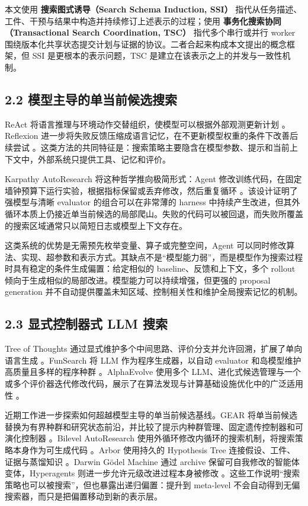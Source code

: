 \documentclass[
  11pt]{ctexart}
\begin{document}
本文使用 \textbf{搜索图式诱导（Search Schema Induction, SSI）}
指代从任务描述、工件、干预与结果中构造并持续修订上述表示的过程；使用
\textbf{事务化搜索协同（Transactional Search Coordination, TSC）}
指代多个串行或并行 worker
围绕版本化共享状态提交计划与证据的协议。二者合起来构成本文提出的概念框架，但
SSI 是更根本的表示问题，TSC 是建立在该表示之上的并发与一致性机制。

\subsection{2.2
模型主导的单当前候选搜索}\label{ux6a21ux578bux4e3bux5bfcux7684ux5355ux5f53ux524dux5019ux9009ux641cux7d22}

ReAct 将语言推理与环境动作交替组织，使模型可以根据外部观测更新计划
\cite{yao2023react}。Reflexion
进一步将失败反馈压缩成语言记忆，在不更新模型权重的条件下改善后续尝试
\cite{shinn2023reflexion}。这类方法的共同特征是：搜索策略主要隐含在模型参数、提示和当前上下文中，外部系统只提供工具、记忆和评价。

Karpathy AutoResearch 将这种哲学推向极简形式：Agent
修改训练代码，在固定墙钟预算下运行实验，根据指标保留或丢弃修改，然后重复循环
\cite{karpathy2026autoresearch}。该设计证明了强模型与清晰
evaluator 的组合可以在非常薄的 harness
中持续产生改进，但其外循环本质上仍接近单当前候选的局部爬山。失败的代码可以被回退，而失败所覆盖的搜索区域通常只以简短日志或模型上下文存在。

这类系统的优势是无需预先枚举变量、算子或完整空间，Agent
可以同时修改算法、实现、超参数和表示方式。其缺点不是``模型能力弱''，而是模型作为搜索过程时具有稳定的条件生成偏置：给定相似的
baseline、反馈和上下文，多个 rollout
倾向于生成相似的局部改进。模型能力可以持续增强，但更强的 proposal
generation
并不自动提供覆盖未知区域、控制相关性和维护全局搜索记忆的机制。

\subsection{2.3 显式控制器式 LLM
搜索}\label{ux663eux5f0fux63a7ux5236ux5668ux5f0f-llm-ux641cux7d22}

Tree of Thoughts
通过显式维护多个中间思路、评价分支并允许回溯，扩展了单向语言生成
\cite{yao2023tot}。FunSearch 将 LLM
作为程序生成器，以自动 evaluator 和岛模型维护高质量且多样的程序种群
\cite{romeraparedes2024funsearch}。AlphaEvolve 使用多个
LLM、进化式候选管理与一个或多个评价器迭代修改代码，展示了在算法发现与计算基础设施优化中的广泛适用性
\cite{novikov2025alphaevolve}。

近期工作进一步探索如何超越模型主导的单当前候选基线。GEAR
将单当前候选替换为有界种群和研究状态前沿，并比较了提示内种群管理、固定遗传控制器和可演化控制器
\cite{jeddi2026gear}。Bilevel AutoResearch
使用外循环修改内循环的搜索机制，将搜索策略本身作为可生成代码
\cite{qu2026bilevel}。Arbor 使用持久的 Hypothesis Tree
连接假设、工件、证据与蒸馏知识
\cite{jin2026arbor}。Darwin Gödel Machine 通过 archive
保留可自我修改的智能体变体，Hyperagents
则进一步允许元级改进过程本身被修改
\cite{zhang2025dgm,zhang2026hyperagents}。这些工作说明``搜索策略也可以被搜索''，但也暴露出递归偏置：提升到
meta-level 不会自动得到无偏搜索器，而只是把偏置移动到新的表示层。
\end{document}
